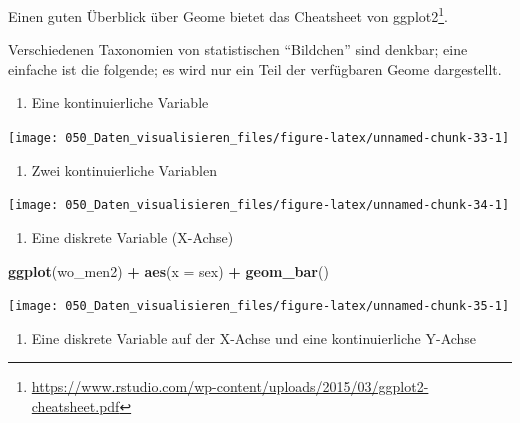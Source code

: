 \documentclass[12pt,ngerman,]{book}
\makeatletter
\newenvironment{Shaded}{\begin{snugshade}}{\end{snugshade}}
\newcommand{\KeywordTok}[1]{\textcolor[rgb]{0.13,0.29,0.53}{\textbf{#1}}}
\newcommand{\DataTypeTok}[1]{\textcolor[rgb]{0.13,0.29,0.53}{#1}}
\newcommand{\StringTok}[1]{\textcolor[rgb]{0.31,0.60,0.02}{#1}}
\newcommand{\OperatorTok}[1]{\textcolor[rgb]{0.81,0.36,0.00}{\textbf{#1}}}
\newcommand{\NormalTok}[1]{#1}
\providecommand{\tightlist}{%
  \setlength{\itemsep}{0pt}\setlength{\parskip}{0pt}}
\let\rmarkdownfootnote\footnote%
\def\footnote{\protect\rmarkdownfootnote}
\newenvironment{kframe}{%
\medskip{}
\setlength{\fboxsep}{.8em}
 \def\at@end@of@kframe{}%
 \ifinner\ifhmode%
  \def\at@end@of@kframe{\end{minipage}}%
  \begin{minipage}{\columnwidth}%
 \fi\fi%
 \def\FrameCommand##1{\hskip\@totalleftmargin \hskip-\fboxsep
 \colorbox{shadecolor}{##1}\hskip-\fboxsep
     \hskip-\linewidth \hskip-\@totalleftmargin \hskip\columnwidth}%
 \MakeFramed {\advance\hsize-\width
   \@totalleftmargin\z@ \linewidth\hsize
   \@setminipage}}%
 {\par\unskip\endMakeFramed%
 \at@end@of@kframe}
\renewenvironment{Shaded}{\begin{kframe}}{\end{kframe}}
\theoremstyle{definition}
\theoremstyle{definition}
\theoremstyle{remark}
\makeatother
\begin{document}
Einen guten Überblick über Geome bietet das Cheatsheet von
ggplot2\footnote{\url{https://www.rstudio.com/wp-content/uploads/2015/03/ggplot2-cheatsheet.pdf}}.

Verschiedenen Taxonomien von statistischen ``Bildchen'' sind denkbar;
eine einfache ist die folgende; es wird nur ein Teil der verfügbaren
Geome dargestellt.

\begin{enumerate}
\def\labelenumi{\arabic{enumi}.}
\tightlist
\item
  Eine kontinuierliche Variable
\end{enumerate}

\begin{center}\texttt{[image: 050\_Daten\_visualisieren\_files/figure-latex/unnamed-chunk-33-1]} \end{center}

\begin{enumerate}
\def\labelenumi{\arabic{enumi}.}
\setcounter{enumi}{1}
\tightlist
\item
  Zwei kontinuierliche Variablen
\end{enumerate}

\begin{center}\texttt{[image: 050\_Daten\_visualisieren\_files/figure-latex/unnamed-chunk-34-1]} \end{center}

\begin{enumerate}
\def\labelenumi{\arabic{enumi}.}
\setcounter{enumi}{2}
\tightlist
\item
  Eine diskrete Variable (X-Achse)
\end{enumerate}

\begin{Shaded}
\begin{Highlighting}[]

\KeywordTok{ggplot}\NormalTok{(wo_men2) }\OperatorTok{+}
\StringTok{  }\KeywordTok{aes}\NormalTok{(}\DataTypeTok{x =}\NormalTok{ sex) }\OperatorTok{+}
\StringTok{  }\KeywordTok{geom_bar}\NormalTok{()}
\end{Highlighting}
\end{Shaded}

\begin{center}\texttt{[image: 050\_Daten\_visualisieren\_files/figure-latex/unnamed-chunk-35-1]} \end{center}

\begin{enumerate}
\def\labelenumi{\arabic{enumi}.}
\setcounter{enumi}{3}
\tightlist
\item
  Eine diskrete Variable auf der X-Achse und eine kontinuierliche
  Y-Achse
\end{enumerate}
\end{document}
